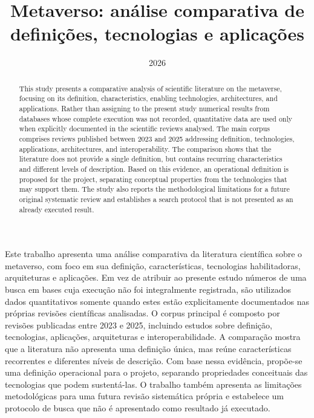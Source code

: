 \documentclass{eic-bcc-tcc}
\title{Metaverso: análise comparativa de definições, tecnologias e aplicações}
\date{2026}
\begin{document}
\maketitle
\makeapproval

\begin{resumo}
Este trabalho apresenta uma análise comparativa da literatura científica sobre o metaverso, com foco em sua definição, características, tecnologias habilitadoras, arquiteturas e aplicações. Em vez de atribuir ao presente estudo números de uma busca em bases cuja execução não foi integralmente registrada, são utilizados dados quantitativos somente quando estes estão explicitamente documentados nas próprias revisões científicas analisadas. O corpus principal é composto por revisões publicadas entre 2023 e 2025, incluindo estudos sobre definição, tecnologias, aplicações, arquiteturas e interoperabilidade. A comparação mostra que a literatura não apresenta uma definição única, mas reúne características recorrentes e diferentes níveis de descrição. Com base nessa evidência, propõe-se uma definição operacional para o projeto, separando propriedades conceituais das tecnologias que podem sustentá-las. O trabalho também apresenta as limitações metodológicas para uma futura revisão sistemática própria e estabelece um protocolo de busca que não é apresentado como resultado já executado.
\end{resumo}

\begin{abstract}
This study presents a comparative analysis of scientific literature on the metaverse, focusing on its definition, characteristics, enabling technologies, architectures, and applications. Rather than assigning to the present study numerical results from databases whose complete execution was not recorded, quantitative data are used only when explicitly documented in the scientific reviews analysed. The main corpus comprises reviews published between 2023 and 2025 addressing definition, technologies, applications, architectures, and interoperability. The comparison shows that the literature does not provide a single definition, but contains recurring characteristics and different levels of description. Based on this evidence, an operational definition is proposed for the project, separating conceptual properties from the technologies that may support them. The study also reports the methodological limitations for a future original systematic review and establishes a search protocol that is not presented as an already executed result.
\end{abstract}

\listoftablespage
\listofacronymspage
\tableofcontentspage

\mainmatter








\backmatter
{}
\end{document}
